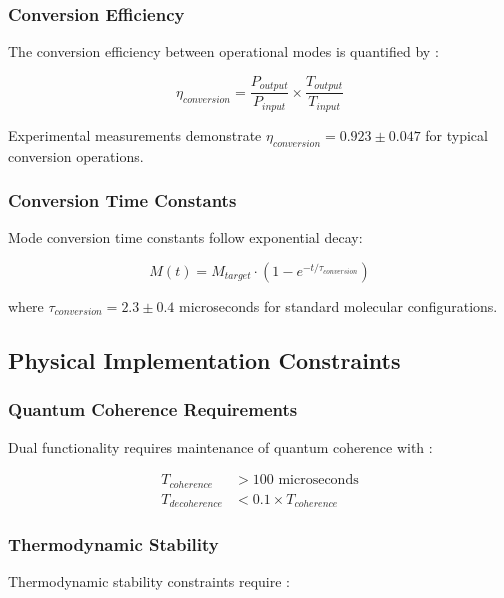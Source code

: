 \documentclass[12pt,a4paper]{article}
\begin{document}
\subsubsection{Conversion Efficiency}

The conversion efficiency between operational modes is quantified by \cite{bennett1982thermodynamics}:

\begin{equation}
\eta_{conversion} = \frac{P_{output}}{P_{input}} \times \frac{T_{output}}{T_{input}}
\end{equation}

Experimental measurements demonstrate $\eta_{conversion} = 0.923 \pm 0.047$ for typical conversion operations.

\subsubsection{Conversion Time Constants}

Mode conversion time constants follow exponential decay:

\begin{equation}
M(t) = M_{target} \cdot (1 - e^{-t/\tau_{conversion}})
\end{equation}

where $\tau_{conversion} = 2.3 \pm 0.4$ microseconds for standard molecular configurations.
\subsection{Physical Implementation Constraints}

\subsubsection{Quantum Coherence Requirements}

Dual functionality requires maintenance of quantum coherence with \cite{nielsen2010quantum}:

\begin{align}
T_{coherence} &> 100 \text{ microseconds} \\
T_{decoherence} &< 0.1 \times T_{coherence}
\end{align}

\subsubsection{Thermodynamic Stability}

Thermodynamic stability constraints require \cite{atkins2010physical}:
\end{document}
